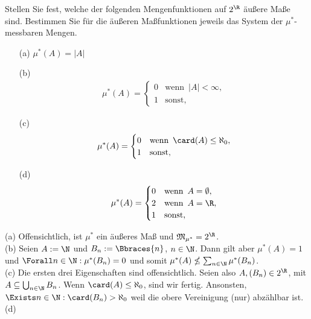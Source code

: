 \begin{exercise}

Stellen Sie fest, welche der folgenden Mengenfunktionen auf $2^\R$ äußere Maße sind. Bestimmen Sie für die äußeren Maßfunktionen jeweils das System der $\mu^\ast$-messbaren Mengen.

\begin{itemize}
  \item[(a)] $\mu^\ast(A) = |A|$
  \item[(b)]
  \begin{align*}
    \mu^\ast(A) =
    \begin{cases}
      0 & \text{wenn} \enspace |A| < \infty, \\
      1 & \text{sonst},
    \end{cases}
  \end{align*}
  \item[(c)]
  \begin{align*}
    \mu^\ast(A) =
    \begin{cases}
      0 & \text{wenn} \enspace \card(A) \leq \aleph_0, \\
      1 & \text{sonst},
    \end{cases}
  \end{align*}
  \item[(d)]
  \begin{align*}
    \mu^\ast(A) =
    \begin{cases}
      0 & \text{wenn} \enspace A = \emptyset, \\
      2 & \text{wenn} \enspace A = \R, \\
      1 & \text{sonst},
    \end{cases}
  \end{align*}
\end{itemize}

\end{exercise}


\begin{solution}

(a) Offensichtlich, ist $\mu^\ast$ ein äußeres Maß und $\mathfrak{M}_{\mu^\ast} = 2^\R$. \\

(b) Seien $A := \N$ und $B_n := \Bbraces{n}$, $n \in \N$. Dann gilt aber $\mu^\ast(A) = 1$ und $\Forall n \in \N: \mu^\ast(B_n) = 0$ und somit $\mu^\ast(A) \nleq \sum_{n \in \N} \mu^\ast(B_n)$. \\

(c) Die ersten drei Eigenschaften sind offensichtlich. Seien also $A, (B_n) \in 2^\R$, mit $A \subseteq \bigcup_{n \in \N} B_n$. Wenn $\card(A) \leq \aleph_0$, sind wir fertig. Ansonsten, $\Exists n \in \N: \card(B_n) > \aleph_0$ weil die obere Vereinigung (nur) abzählbar ist. \\

(d)

\end{solution}
